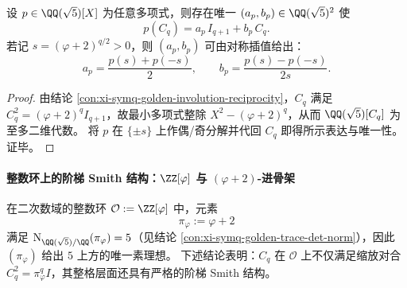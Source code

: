 \begin{conclusion}\label{con:xi-symq-golden-functional-calculus}
设 \(p\in\QQ(\sqrt5)[X]\) 为任意多项式，则存在唯一 \((a_p,b_p)\in\QQ(\sqrt5)^2\) 使
\[
\boxed{\;
p(C_q)=a_p\,I_{q+1}+b_p\,C_q.\;}
\]
若记 \(s=(\varphi+2)^{q/2}>0\)，则 \((a_p,b_p)\) 可由对称插值给出：
\[
a_p=\frac{p(s)+p(-s)}{2},
\qquad
b_p=\frac{p(s)-p(-s)}{2s}.
\]
\end{conclusion}
\begin{proof}
由结论 \ref{con:xi-symq-golden-involution-reciprocity}，\(C_q\) 满足 \(C_q^2=(\varphi+2)^q I_{q+1}\)，故最小多项式整除 \(X^2-(\varphi+2)^q\)，从而 \(\QQ(\sqrt5)[C_q]\) 为至多二维代数。
将 \(p\) 在 \(\{\pm s\}\) 上作偶/奇分解并代回 \(C_q\) 即得所示表达与唯一性。证毕。
\end{proof}

\paragraph{整数环上的阶梯 Smith 结构：\texorpdfstring{$\ZZ[\varphi]$}{Z[phi]} 与 \texorpdfstring{$(\varphi+2)$}{phi+2}-进骨架}
在二次数域的整数环 \(\mathcal O:=\ZZ[\varphi]\) 中，元素
\[
\pi_\varphi:=\varphi+2
\]
满足 \(\mathrm N_{\QQ(\sqrt5)/\QQ}(\pi_\varphi)=5\)（见结论 \ref{con:xi-symq-golden-trace-det-norm}），因此 \((\pi_\varphi)\) 给出 \(5\) 上方的唯一素理想。
下述结论表明：\(C_q\) 在 \(\mathcal O\) 上不仅满足缩放对合 \(C_q^2=\pi_\varphi^q I\)，其整格层面还具有严格的阶梯 Smith 结构。

